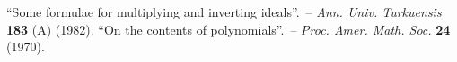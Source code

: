 \documentclass[12pt]{article}
\theoremstyle{definition}
\begin{document}
\begin{thebibliography}{9}
  ``{Some formulae for multiplying and inverting ideals}''. \,-- {\em Ann. Univ. Turkuensis} \textbf{183} (A) (1982).
  ``{On the contents of polynomials}''. \,-- {\em Proc. Amer. Math. Soc.} \textbf{24} (1970).
\end{thebibliography}
\end{document}
